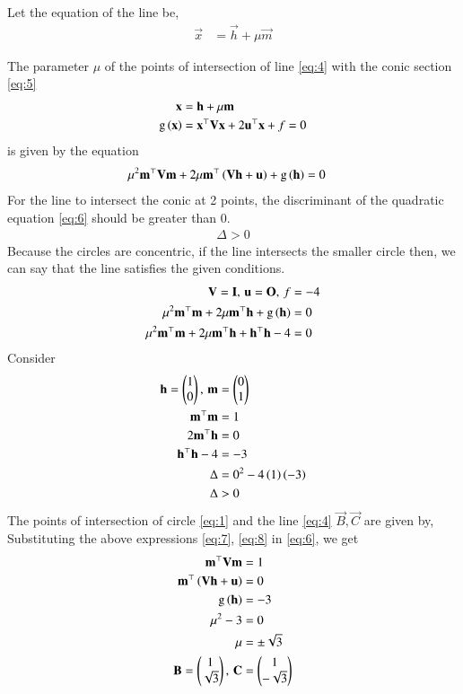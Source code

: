 \documentclass[journal,12pt,twocolumn]{IEEEtran}
\begin{document}
\begin{enumerate}
Let the equation of the line be,
\begin{align}
\vec{x} &= \vec{h} + \mu \vec{m}
\end{align}

The parameter $\mu$ of the points of intersection of line \eqref{eq:4} with the conic section \eqref{eq:5}
\begin{align}
\mathbf{x} &= \mathbf{h} + \mu \mathbf{m}
\label{eq:4}\\
\text{g}\left(\mathbf{x}\right) &= \mathbf{x}^{\top}\mathbf{V}\mathbf{x}+2\mathbf{u}^{\top}\mathbf{x}+f=0
\label{eq:5}
\end{align}
is given by the equation 
\begin{align}
\mu^2\mathbf{m}^{\top}\mathbf{V}\mathbf{m} + 2 \mu\mathbf{m}^{\top}\left(\mathbf{V}\mathbf{h}+\mathbf{u}\right) 
	+ \text{g}\left(\mathbf{h}\right) &=0
\label{eq:6}
\end{align}
For the line to intersect the conic at 2 points, the discriminant of the quadratic equation \eqref{eq:6} should be greater than 0.
\begin{align}
\Delta > 0
\end{align}
Because the circles are concentric, if the line intersects the smaller circle then, we can say that the line satisfies the given conditions.
\begin{align}
\mathbf{V} = \mathbf{I}, \, \mathbf{u} = \mathbf{O}, \, f &= -4
\label{eq:7}\\
\mu^2\mathbf{m}^{\top}\mathbf{m} + 2 \mu\mathbf{m}^{\top}\mathbf{h} 
	+ \text{g}\left(\mathbf{h}\right) &=0\\
\mu^2\mathbf{m}^{\top}\mathbf{m} + 2 \mu\mathbf{m}^{\top}\mathbf{h} 
	+ \mathbf{h}^{\top}\mathbf{h}-4 &=0\\	
\label{eq:8}
\end{align} 
Consider
\begin{align}
\mathbf{h} = \begin{pmatrix}1\\0\end{pmatrix}, \, \mathbf{m} &= \begin{pmatrix}0\\1\end{pmatrix}\\
\mathbf{m}^{\top}\mathbf{m} &=1 \\
2\mathbf{m}^\top\mathbf{h} &= 0\\
\mathbf{h}^\top\mathbf{h}-4 &= -3\\
\Delta &= 0^2 - 4\left(1\right)\left(-3\right)\\
\Delta &> 0
\end{align}
The points of intersection of circle \eqref{eq:1} and the line \eqref{eq:4} $\vec{B},\vec{C}$ are given by,
Substituting the above expressions \eqref{eq:7}, \eqref{eq:8} in \eqref{eq:6}, we get
\begin{align}
\mathbf{m}^{\top}\mathbf{V}\mathbf{m} & = 1\\
\mathbf{m}^{\top}\left(\mathbf{V}\mathbf{h}+\mathbf{u}\right) &= 0 \\
\text{g}\left(\mathbf{h}\right) &= -3\\
\mu ^2 - 3 &= 0\\
\mu &= \pm \sqrt{3}\\
\mathbf{B} = \begin{pmatrix}1\\\sqrt{3}\end{pmatrix}, \, \mathbf{C} &= \begin{pmatrix}1\\-\sqrt{3}\end{pmatrix}
\end{align}


\end{enumerate}
\end{document}
